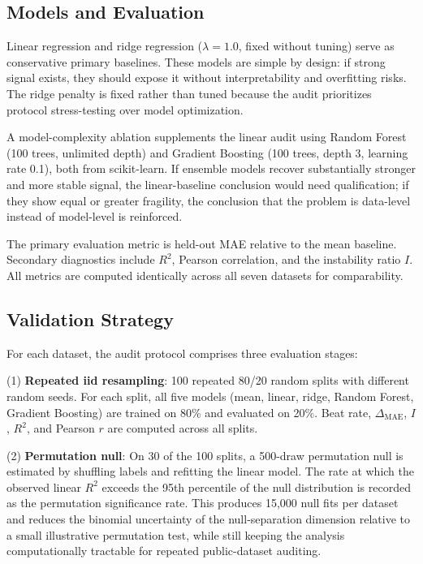 \documentclass[10pt,letterpaper]{article}
\begin{document}
\subsection{Models and Evaluation}
Linear regression and ridge regression ($\lambda = 1.0$, fixed without tuning) serve as conservative primary baselines. These models are simple by design: if strong signal exists, they should expose it without interpretability and overfitting risks. The ridge penalty is fixed rather than tuned because the audit prioritizes protocol stress-testing over model optimization.

A model-complexity ablation supplements the linear audit using Random Forest (100 trees, unlimited depth) and Gradient Boosting (100 trees, depth 3, learning rate 0.1), both from scikit-learn. If ensemble models recover substantially stronger and more stable signal, the linear-baseline conclusion would need qualification; if they show equal or greater fragility, the conclusion that the problem is data-level instead of model-level is reinforced.

The primary evaluation metric is held-out MAE relative to the mean baseline. Secondary diagnostics include $R^2$, Pearson correlation, and the instability ratio $I$. All metrics are computed identically across all seven datasets for comparability.

\subsection{Validation Strategy}
For each dataset, the audit protocol comprises three evaluation stages:

(1) \textbf{Repeated iid resampling}: 100 repeated 80/20 random splits with different random seeds. For each split, all five models (mean, linear, ridge, Random Forest, Gradient Boosting) are trained on 80\% and evaluated on 20\%. Beat rate, $\Delta_{\mathrm{MAE}}$, $I$, $R^2$, and Pearson $r$ are computed across all splits.

(2) \textbf{Permutation null}: On 30 of the 100 splits, a 500-draw permutation null is estimated by shuffling labels and refitting the linear model. The rate at which the observed linear $R^2$ exceeds the 95th percentile of the null distribution is recorded as the permutation significance rate. This produces 15{,}000 null fits per dataset and reduces the binomial uncertainty of the null-separation dimension relative to a small illustrative permutation test, while still keeping the analysis computationally tractable for repeated public-dataset auditing.
\end{document}
